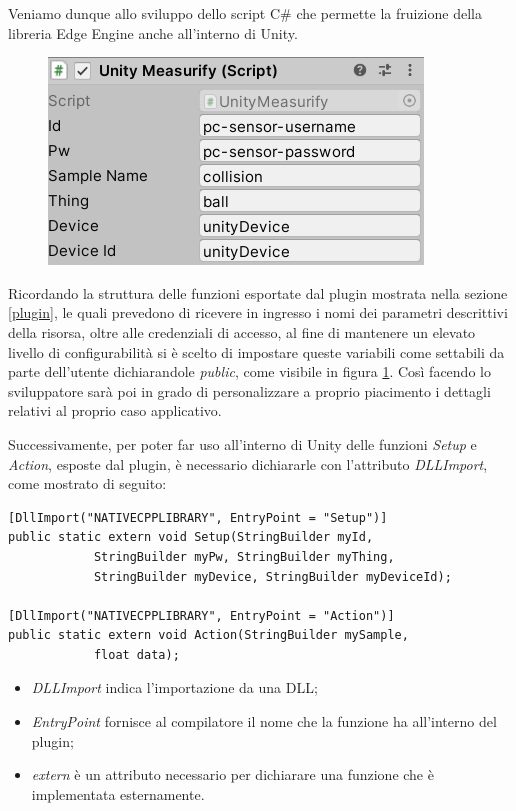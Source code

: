 Veniamo dunque allo sviluppo dello script C\# che permette la fruizione della libreria Edge Engine anche all'interno di Unity.  

\begin{figure}
	\centering
	\includegraphics[scale=0.85]{pics/unityscriptvars}
	\caption{}
	\label{unityscriptvars}
\end{figure}

Ricordando la struttura delle funzioni esportate dal plugin mostrata nella sezione \ref{plugin}, le quali prevedono di ricevere in ingresso i nomi dei parametri descrittivi della risorsa, oltre alle credenziali di accesso, al fine di mantenere un elevato livello di configurabilità si è scelto di impostare queste variabili come settabili da parte dell'utente dichiarandole \textit{public}, come visibile in figura \ref{unityscriptvars}. Così facendo lo sviluppatore sarà poi in grado di personalizzare a proprio piacimento i dettagli relativi al proprio caso applicativo.

Successivamente, per poter far uso all'interno di Unity delle funzioni \textit{Setup} e \textit{Action}, esposte dal plugin, è necessario dichiararle con l’attributo \textit{DLLImport}, come mostrato di seguito:

\begin{verbatim}
[DllImport("NATIVECPPLIBRARY", EntryPoint = "Setup")]
public static extern void Setup(StringBuilder myId, 
            StringBuilder myPw, StringBuilder myThing, 
            StringBuilder myDevice, StringBuilder myDeviceId);

[DllImport("NATIVECPPLIBRARY", EntryPoint = "Action")]
public static extern void Action(StringBuilder mySample, 
            float data);
\end{verbatim}

\begin{itemize}
	\item \textit{DLLImport} indica l'importazione da una DLL;
	\item \textit{EntryPoint} fornisce al compilatore il nome che la funzione ha all'interno del plugin;
	\item \textit{extern} è un attributo necessario per dichiarare una funzione che è implementata esternamente.
\end{itemize}

